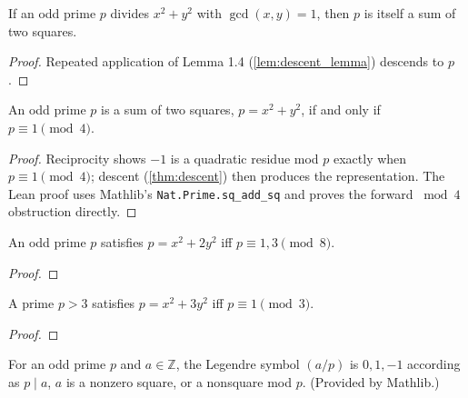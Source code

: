 \begin{theorem}[Descent Step, $n=1$; Cox \S1]
  \label{thm:descent}
  \leanok
  If an odd prime $p$ divides $x^2+y^2$ with $\gcd(x,y)=1$, then $p$ is itself a
  sum of two squares.
\end{theorem}
\begin{proof}
  Repeated application of Lemma 1.4 (\ref{lem:descent_lemma}) descends to $p$.
\end{proof}

\begin{theorem}
  \label{thm:fermat_two_squares}
  \leanok
  An odd prime $p$ is a sum of two squares, $p = x^2 + y^2$, if and only if
  $p \equiv 1 \pmod 4$.
\end{theorem}
\begin{proof}\leanok
  Reciprocity shows $-1$ is a quadratic residue mod $p$ exactly when
  $p \equiv 1 \pmod 4$; descent (\ref{thm:descent}) then produces the
  representation. The Lean proof uses Mathlib's
  \texttt{Nat.Prime.sq\_add\_sq} and proves the forward $\bmod 4$ obstruction
  directly.
\end{proof}

\begin{theorem}[$x^2 + 2y^2$]
  \label{thm:fermat_x2_2y2}
  \leanok
  An odd prime $p$ satisfies $p = x^2 + 2y^2$ iff $p \equiv 1, 3 \pmod 8$.
\end{theorem}
\begin{proof}
\end{proof}

\begin{theorem}[$x^2 + 3y^2$]
  \label{thm:fermat_x2_3y2}
  \leanok
  A prime $p > 3$ satisfies $p = x^2 + 3y^2$ iff $p \equiv 1 \pmod 3$.
\end{theorem}
\begin{proof}
\end{proof}

\begin{definition}
  \label{def:legendre_symbol}
  \leanok
  For an odd prime $p$ and $a \in \mathbb Z$, the Legendre symbol $(a/p)$ is
  $0, 1, -1$ according as $p \mid a$, $a$ is a nonzero square, or a nonsquare mod
  $p$. (Provided by Mathlib.)
\end{definition}

